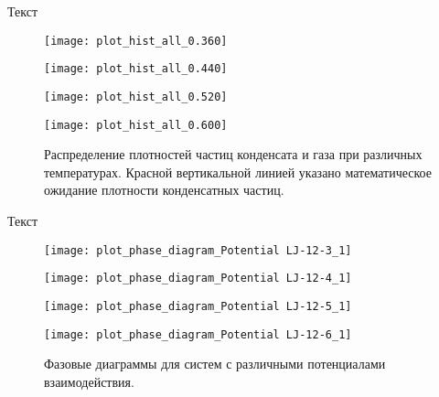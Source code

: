 Текст

\begin{figure}[htbp!]
\begin{center}

\begin{minipage}[h]{0.45\linewidth}
\texttt{[image: plot\_hist\_all\_0.360]}
\end{minipage}
\begin{minipage}[h]{0.45\linewidth}
\texttt{[image: plot\_hist\_all\_0.440]}
\end{minipage}


\begin{minipage}[h]{0.45\linewidth}
\texttt{[image: plot\_hist\_all\_0.520]}
\end{minipage}
\begin{minipage}[h]{0.45\linewidth}
\texttt{[image: plot\_hist\_all\_0.600]}
\end{minipage}
\caption{Распределение плотностей частиц конденсата и газа при различных температурах. Красной вертикальной линией указано математическое ожидание плотности конденсатных частиц.}
\label{ris8}
\end{center}
\end{figure}


Текст


\begin{figure}[htbp!]
\begin{center}
\begin{minipage}[h]{0.45\linewidth}
\texttt{[image: plot\_phase\_diagram\_Potential LJ-12-3\_1]}
\end{minipage}
\begin{minipage}[h]{0.45\linewidth}
\texttt{[image: plot\_phase\_diagram\_Potential LJ-12-4\_1]}
\end{minipage}


\begin{minipage}[h]{0.45\linewidth}
\texttt{[image: plot\_phase\_diagram\_Potential LJ-12-5\_1]}
\end{minipage}
\begin{minipage}[h]{0.45\linewidth}
\texttt{[image: plot\_phase\_diagram\_Potential LJ-12-6\_1]}
\end{minipage}
\caption{Фазовые диаграммы для систем с различными потенциалами взаимодействия.}
\label{ris9}
\end{center}
\end{figure}



